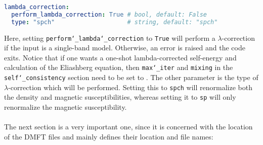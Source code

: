 \documentclass[../../main.tex]{subfiles}
\begin{document}
\begin{minipage}{\textwidth}%
\begin{lstlisting}[language=yaml]
lambda_correction:
  perform_lambda_correction: True # bool, default: False
  type: "spch"                    # string, default: "spch"
\end{lstlisting}
\end{minipage}
Here, setting \texttt{perform\char`_lambda\char`_correction} to \texttt{True} will perform a $\lambda$-correction if the input is a single-band model. Otherwise, an error is raised and the code exits. Notice that if one wants a one-shot lambda-corrected self-energy and calculation of the Eliashberg equation, then \texttt{max\char`_iter} and \texttt{mixing} in the \texttt{self\char`_consistency} section need to be set to . The other parameter is the type of $\lambda$-correction which will be performed. Setting this to \texttt{spch} will renormalize both the density and magnetic susceptibilities, whereas setting it to \texttt{sp} will only renormalize the magnetic susceptibility.
\\\\
The next section is a very important one, since it is concerned with the location of the DMFT files and mainly defines their location and file names:
\end{document}
